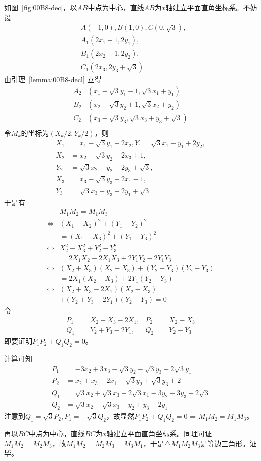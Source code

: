 如图~\ref{fig:00B8-dec}，以$AB$中点为中心，直线$AB$为$x$轴建立平面直角坐标系。不妨设
\begin{align*}
  & A(-1, 0), B(1, 0), C(0, \sqrt3), \\
  & A_1(2x_1 - 1, 2y_1), \\
  & B_1(2x_2 + 1, 2y_2), \\
  & C_1(2x_3, 2y_3 + \sqrt3)
\end{align*}
由引理~\ref{lemma:00B8-decl} 立得
\begin{align*}
  A_2&(x_1 - \sqrt3y_1 - 1, \sqrt3x_1 + y_1) \\
  B_2&(x_2 - \sqrt3y_2 + 1, \sqrt3x_2 + y_2) \\
  C_2&(x_3 - \sqrt3y_3, \sqrt3x_3 + y_3 + \sqrt3) \\
\end{align*}
令$M_k$的坐标为$(X_k/2, Y_k/2)$，则
\begin{align*}
  X_1 &= x_1 - \sqrt3y_1 + 2x_2, Y_1 = \sqrt3x_1 + y_1 + 2y_2, \\
  X_2 &= x_2 - \sqrt3y_2 + 2x_3 + 1, \\
  Y_2 &= \sqrt3x_2 + y_2 + 2y_3 + \sqrt3, \\
  X_3 &= x_3 - \sqrt3y_3 + 2x_1 - 1, \\
  Y_3 &= \sqrt3x_3 + y_3 + 2y_1 + \sqrt3
\end{align*}
于是有
\begin{align*}
  & M_1M_2 = M_1M_3 \\
  \Leftrightarrow{}& (X_1 - X_2)^2 + (Y_1 - Y_2)^2 \\
  &= (X_1 - X_3)^2 + (Y_1 - Y_3)^2 \\
  \Leftrightarrow{}& X_2^2 - X_3^2 + Y_2^2 - Y_3^2 \\
  &= 2X_1X_2 - 2X_1X_3 + 2Y_1Y_2 - 2Y_1Y_3 \\
  \Leftrightarrow{}& (X_2 + X_3)(X_2 - X_3) + (Y_2 + Y_3)(Y_2 - Y_3) \\
  &= 2X_1(X_2 - X_3) + 2Y_1(Y_2 - Y_3) \\
  \Leftrightarrow{}& (X_2 + X_3 - 2X_1)(X_2 - X_3) \\
  &+ (Y_2 + Y_3 - 2Y_1)(Y_2 - Y_3) = 0
\end{align*}
令
\begin{align*}
  P_1 &= X_2 + X_3 - 2X_1, & P_2 &= X_2 - X_3 \\
  Q_1 &= Y_2 + Y_3 - 2Y_1, & Q_2 &= Y_2 - Y_3
\end{align*}
即要证明$P_1P_2 + Q_1Q_2 = 0$。

计算可知
\begin{align*}
  P_1 &= -3x_2 + 3x_3 - \sqrt3y_2 - \sqrt3y_3 + 2\sqrt3y_1 \\
  P_2 &= x_2 + x_3 - 2x_1 - \sqrt3y_2 + \sqrt3y_3 + 2 \\
  Q_1 &= \sqrt3x_2 + \sqrt3x_3 - 2\sqrt3x_1 - 3y_2 + 3y_3 + 2\sqrt3 \\
  Q_2 &= \sqrt3x_2 - \sqrt3x_3 + y_2 + y_3 - 2y_1
\end{align*}
注意到$Q_1 = \sqrt3P_2, P_1 = -\sqrt3Q_2$，故显然$P_1P_2 + Q_1Q_2 = 0 \Rightarrow M_1M_2 = M_1M_3$。

再以$BC$中点为中心，直线$BC$为$x$轴建立平面直角坐标系。同理可证$M_1M_2 = M_2M_3$，故$M_1M_2 = M_2M_3 = M_3M_1$，于是$\triangle M_1M_2M_3$是等边三角形。证毕。
